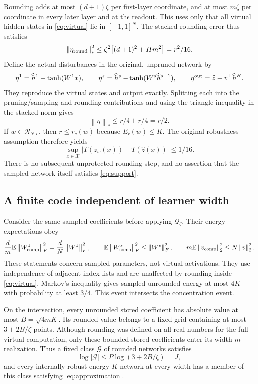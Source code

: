 \documentclass[11pt]{article}
\newcommand{\E}{\mathbb E}
\newcommand{\norm}[1]{\left\|#1\right\|}
\begin{document}
Rounding adds at most $(d+1)\zeta$ per first-layer coordinate, and at
most $m\zeta$ per coordinate in every later layer and at the readout.
This uses only that all virtual hidden states in \eqref{eq:virtual} lie
in $[-1,1]^N$. The stacked rounding error thus satisfies
\[
 \norm{\eta_{\rm round}}_*^2
 \le\zeta^2\bigl[(d+1)^2+Hm^2\bigr]=r^2/16.
\]
Define the actual disturbances in the original, unpruned network by
\[
 \eta^1=\widehat h^1-\tanh(W^1\bar x),\qquad
 \eta^s=\widehat h^s-\tanh(W^s\widehat h^{s-1}),\qquad
 \eta^{\rm out}=\widehat z-v^\top\widehat h^H.
\]
They reproduce the virtual states and output exactly. Splitting each
into the pruning/sampling and rounding contributions and using the
triangle inequality in the stacked norm gives
\begin{equation}\label{eq:noise-budget}
 \norm\eta_*\le r/4+r/4=r/2.
\end{equation}
If $w\in\mathcal R_{N,c}$, then $r\le r_c(w)$ because $E_v(w)\le K$.
The original robustness assumption therefore yields
\begin{equation}\label{eq:approximation}
 \sup_{x\in\mathcal X}|T(z_w(x))-T(\widehat z(x))|\le1/16.
\end{equation}
There is no subsequent unprotected rounding step, and no assertion that
the sampled network itself satisfies \eqref{eq:support}.

\subsection{A finite code independent of learner width}
Consider the same sampled coefficients before applying
$\mathcal Q_\zeta$. Their energy expectations obey
\[
 \frac dm\E\norm{W^1_{\rm comp}}_F^2
   =\frac dN\norm{W^1}_F^2,\qquad
 \E\norm{W^s_{\rm comp}}_F^2\le\norm{W^s}_F^2,\qquad
 m\E\norm{v_{\rm comp}}_2^2\le N\norm v_2^2.
\]
These statements concern sampled parameters, not virtual activations.
They use independence of adjacent index lists and are unaffected by
rounding inside \eqref{eq:virtual}. Markov's inequality gives sampled
unrounded energy at most $4K$ with probability at least $3/4$.
This event intersects the concentration event.

On the intersection, every unrounded stored coefficient has absolute value
at most $B=\sqrt{4mK}$. Its rounded value belongs to a fixed grid containing
at most $3+2B/\zeta$ points. Although rounding was defined on all real
numbers for the full virtual computation, only these bounded stored
coefficients enter its width-$m$ realization. Thus a fixed class
$\mathcal G$ of rounded networks satisfies
\begin{equation}\label{eq:code}
 \log|\mathcal G|\le P\log(3+2B/\zeta)=J,
\end{equation}
and every internally robust energy-$K$ network at every width has a member
of this class satisfying \eqref{eq:approximation}.
\end{document}
